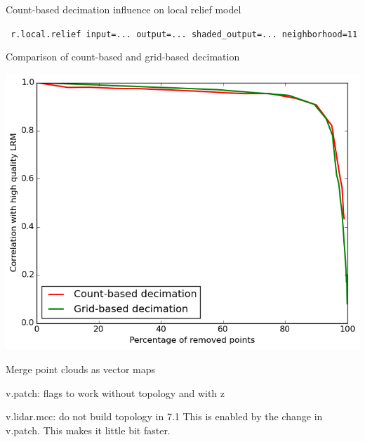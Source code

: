 \documentclass[xcolor={dvipsnames,usenames},beamer,aspectratio=169]{beamer}
\begin{document}
\begin{frame}{Count-based decimation influence on local relief model}
%
~%
%
~%
%
~%
%

\bigskip

\begin{flushleft}

\texttt{
r.local.relief
input=...
output=...
shaded\_output=...
neighborhood=11
}


\end{flushleft}

\end{frame}


\begin{frame}{Comparison of count-based and grid-based decimation}

\begin{center}
\includegraphics[height=0.8\textheight]{lrm_comparison_grid_count}
\end{center}

\end{frame}


\begin{frame}{Merge point clouds as vector maps}

v.patch: flags to work without topology and with z

v.lidar.mcc: do not build topology in 7.1
This is enabled by the change in v.patch.
This makes it little bit faster.

\end{frame}
\end{document}
